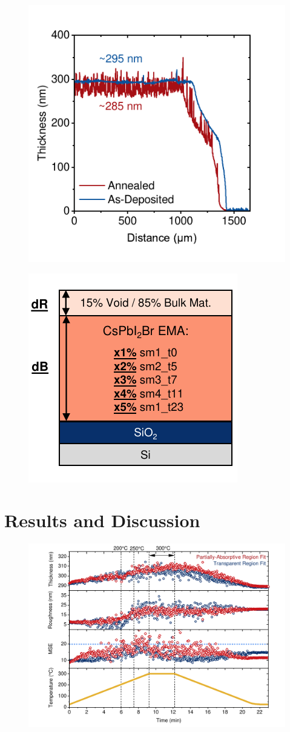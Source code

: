 \begin{figure}
  \centering
  \medskip
  \includegraphics[width=.5\textwidth]{chapters/ellipsometry/image/Dektak.pdf}
  \caption{}
  \label{fig:ellipsometry:profilometry}
\end{figure}



\begin{figure}
  \centering
  \medskip
  \includegraphics[width=.45\textwidth]{chapters/ellipsometry/image/Dynamic_Model.pdf}
  \caption{}
  \label{fig:ellipsometry:dynamic_model}
\end{figure}



\section{Results and Discussion}

\begin{figure}
  \centering
  \medskip
  \includegraphics[width=.99\textwidth]{chapters/ellipsometry/image/Roughness_Thickness.pdf}
  \caption{}
  \label{fig:ellipsometry:roughness_thickness}
\end{figure}


